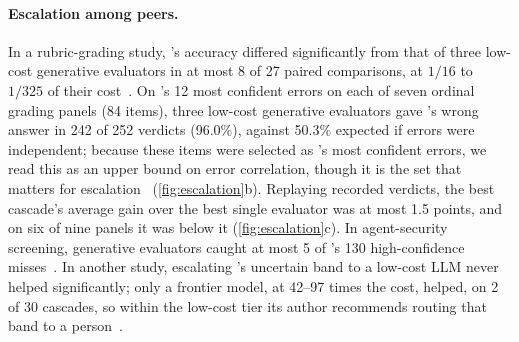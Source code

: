 \paragraph{Escalation among peers.}
In a rubric-grading study, \jev{}'s accuracy differed significantly from that of three low-cost generative evaluators in at most 8 of 27 paired comparisons, at $1/16$ to $1/325$ of their cost~\cite{arx29769}. On \jev{}'s 12 most confident errors on each of seven ordinal grading panels (84 items), three low-cost generative evaluators gave \jev{}'s wrong answer in 242 of 252 verdicts (96.0\%), against 50.3\% expected if errors were independent; because these items were selected as \jev{}'s most confident errors, we read this as an upper bound on error correlation, though it is the set that matters for escalation~\cite{arx29769} (\cref{fig:escalation}b).
Replaying recorded verdicts, the best cascade's average gain over the best single evaluator was at most 1.5 points, and on six of nine panels it was below it (\cref{fig:escalation}c).
In agent-security screening, generative evaluators caught at most 5 of \jev{}'s 130 high-confidence misses~\cite{arx33401}.
In another study, escalating \jev{}'s uncertain band to a low-cost LLM never helped significantly; only a frontier model, at 42--97 times the cost, helped, on 2 of 30 cascades, so within the low-cost tier its author recommends routing that band to a person~\cite{zen22885291}\zmark{}.

